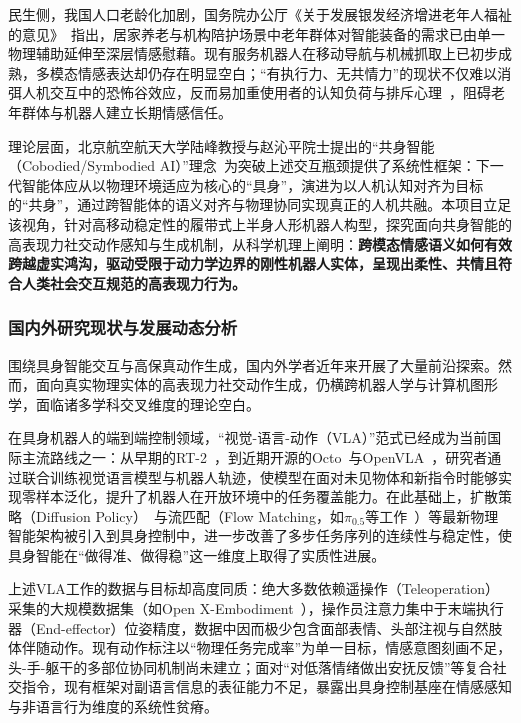 民生侧，我国人口老龄化加剧，国务院办公厅《关于发展银发经济增进老年人福祉的意见》~\cite{SilverEcon2024}指出，居家养老与机构陪护场景中老年群体对智能装备的需求已由单一物理辅助延伸至深层情感慰藉。现有服务机器人在移动导航与机械抓取上已初步成熟，多模态情感表达却仍存在明显空白；``有执行力、无共情力''的现状不仅难以消弭人机交互中的恐怖谷效应，反而易加重使用者的认知负荷与排斥心理~\cite{qiao2022brain}，阻碍老年群体与机器人建立长期情感信任。

理论层面，北京航空航天大学陆峰教授与赵沁平院士提出的``共身智能（Cobodied/Symbodied AI）''理念~\cite{lu2025cobodied}为突破上述交互瓶颈提供了系统性框架：下一代智能体应从以物理环境适应为核心的``具身''，演进为以人机认知对齐为目标的``共身''，通过跨智能体的语义对齐与物理协同实现真正的人机共融。本项目立足该视角，针对高移动稳定性的履带式上半身人形机器人构型，探究面向共身智能的高表现力社交动作感知与生成机制，从科学机理上阐明：\textbf{跨模态情感语义如何有效跨越虚实鸿沟，驱动受限于动力学边界的刚性机器人实体，呈现出柔性、共情且符合人类社会交互规范的高表现力行为。}

\subsubsection{国内外研究现状与发展动态分析}

围绕具身智能交互与高保真动作生成，国内外学者近年来开展了大量前沿探索。然而，面向真实物理实体的高表现力社交动作生成，仍横跨机器人学与计算机图形学，面临诸多学科交叉维度的理论空白。

在具身机器人的端到端控制领域，``视觉-语言-动作（VLA）''范式已经成为当前国际主流路线之一：从早期的RT-2~\cite{brohan2023rt2}，到近期开源的Octo~\cite{octo2024}与OpenVLA~\cite{kim2024openvla}，研究者通过联合训练视觉语言模型与机器人轨迹，使模型在面对未见物体和新指令时能够实现零样本泛化，提升了机器人在开放环境中的任务覆盖能力。在此基础上，扩散策略（Diffusion Policy）~\cite{chi2023diffusion}与流匹配（Flow Matching，如$\pi_{0.5}$等工作~\cite{Intelligence2025}）等最新物理智能架构被引入到具身控制中，进一步改善了多步任务序列的连续性与稳定性，使具身智能在“做得准、做得稳”这一维度上取得了实质性进展。

上述VLA工作的数据与目标却高度同质：绝大多数依赖遥操作（Teleoperation）采集的大规模数据集（如Open X-Embodiment~\cite{Abigail2024open}），操作员注意力集中于末端执行器（End-effector）位姿精度，数据中因而极少包含面部表情、头部注视与自然肢体伴随动作。现有动作标注以``物理任务完成率''为单一目标，情感意图刻画不足，头-手-躯干的多部位协同机制尚未建立；面对``对低落情绪做出安抚反馈''等复合社交指令，现有框架对副语言信息的表征能力不足，暴露出具身控制基座在情感感知与非语言行为维度的系统性贫瘠。

